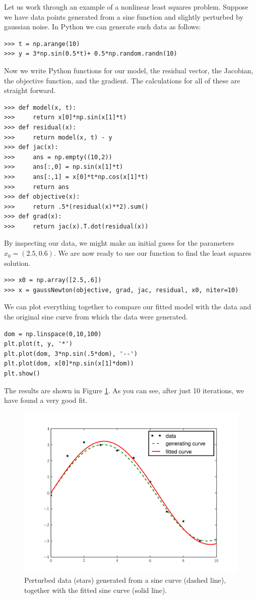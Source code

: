 Let us work through an example of a nonlinear least squares problem. Suppose we have data points
generated from a sine function and slightly perturbed by gaussian noise. In Python we can generate such
data as follows:
\begin{lstlisting}
>>> t = np.arange(10)
>>> y = 3*np.sin(0.5*t)+ 0.5*np.random.randn(10)
\end{lstlisting}
Now we write Python functions for our model, the residual vector, the Jacobian, the objective function,
and the gradient. The calculations for all of these are straight forward.
\begin{lstlisting}
>>> def model(x, t):
>>>     return x[0]*np.sin(x[1]*t)
>>> def residual(x):
>>>     return model(x, t) - y
>>> def jac(x):
>>>     ans = np.empty((10,2))
>>>     ans[:,0] = np.sin(x[1]*t)
>>>     ans[:,1] = x[0]*t*np.cos(x[1]*t)
>>>     return ans
>>> def objective(x):
>>>     return .5*(residual(x)**2).sum()
>>> def grad(x):
>>>     return jac(x).T.dot(residual(x))
\end{lstlisting}
By inspecting our data, we might make an initial guess for the parameters $x_0 = (2.5, 0.6)$.
We are now ready to use our  function to find the least squares solution.
\begin{lstlisting}
>>> x0 = np.array([2.5,.6])
>>> x = gaussNewton(objective, grad, jac, residual, x0, niter=10)
\end{lstlisting}
We can plot everything together to compare our fitted model with the data and the original sine
curve from which the data were generated.
\begin{lstlisting}
dom = np.linspace(0,10,100)
plt.plot(t, y, '*')
plt.plot(dom, 3*np.sin(.5*dom), '--')
plt.plot(dom, x[0]*np.sin(x[1]*dom))
plt.show()
\end{lstlisting}
The results are shown in Figure \ref{linesearch:gaussNewton}. As you can see, after just 10
iterations, we have found a very good fit.
\begin{figure}
\centering
\includegraphics[width=\textwidth]{gaussNewton.pdf}
\caption{Perturbed data (stars) generated from a sine curve (dashed line),
together with the fitted sine curve (solid line).
}
\label{linesearch:gaussNewton}
\end{figure}

